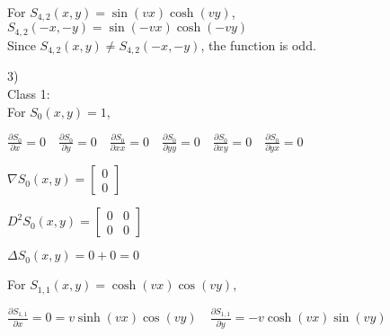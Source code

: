 \documentclass[12pt, executivepaper]{article}
\begin{document}
\begin{flushleft}
\vspace{3mm}

For $S_{4,2}(x,y)=\sin(vx)\cosh(vy)$, \\

$S_{4,2}(-x,-y)=\sin(-vx)\cosh(-vy)$ \\

Since $S_{4,2}(x,y) \neq S_{4,2}(-x,-y)$, the function is odd. \\
 
\vspace{5mm}

3) \\

Class 1: \\

For $S_{0}(x,y)=1$, \\

\vspace{3mm}

$\frac{\partial S_{0}}{\partial x}=0 \quad \frac{\partial S_{0}}{\partial y}=0 \quad \frac{\partial S_{0}}{\partial xx}=0 \quad \frac{\partial S_{0}}{\partial yy}=0 \quad \frac{\partial S_{0}}{\partial xy}=0 \quad \frac{\partial S_{0}}{\partial yx}=0$ \\

\vspace{3mm}

$\nabla S_{0}(x,y)=
\begin{bmatrix}
0 \\
0
\end{bmatrix}$

\vspace{3mm}

$D^2 S_{0}(x,y)=
\begin{bmatrix}
0 & 0 \\
0 & 0
\end{bmatrix}$

\vspace{3mm}

$\Delta S_{0}(x,y)=0+0=0$

\vspace{5mm}

For $S_{1,1}(x,y)=\cosh(vx)\cos(vy)$, \\

\vspace{3mm}

$\frac{\partial S_{1,1}}{\partial x}=0=v\sinh(vx)\cos(vy) \quad \frac{\partial S_{1,1}}{\partial y}=-v\cosh(vx)\sin(vy)$ \\


\end{flushleft}
\end{document}
